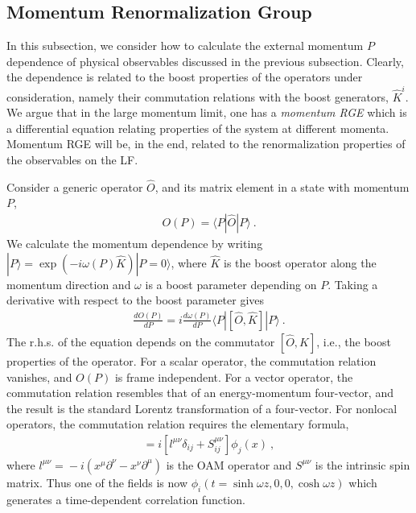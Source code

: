 \subsection{Momentum Renormalization Group}
\label{sec:lamet-rg}
In this subsection, we consider how to calculate the external momentum $P$
dependence of physical observables discussed in
the previous subsection.
Clearly, the dependence is related to the boost properties of
the operators under consideration, namely their commutation relations
with the boost generators, {$\hat{K}^i$}.
We argue that in the large momentum limit, one
has a {\it momentum RGE} which
is a differential equation relating
properties of the system at different momenta.
Momentum RGE will be, in the end, related to
the renormalization properties of the observables on
the LF.

Consider a generic operator $\hat O$, and its
matrix element in a state with momentum $P$,
\begin{align}
	O(P) = \langle P|\hat O|P\rangle \ .
\end{align}
We calculate the momentum dependence by writing $|P\rangle
= \exp(-i\omega(P) \hat K)|P=0\rangle$, where $\hat K$ is
the boost operator along the momentum direction and $\omega$ is
a boost parameter depending on $P$.
Taking a derivative with respect to the {boost} parameter gives
\begin{align}
	\frac{d O(P)}{dP} = i\frac{d\omega(P)}{dP}\langle P|[\hat O,\hat K]|P\rangle \ .
	\label{eq:momden}
\end{align}
The {r.h.s.} of the equation depends on the commutator
$[\hat O,\hat K]$, i.e., the boost properties of the operator.
For a scalar operator, the commutation relation vanishes, and $O(P)$
is frame independent.
For a vector operator, the commutation relation resembles that of an energy-momentum four-vector,
and the result is the standard Lorentz transformation of a four-vector.
For nonlocal operators, the commutation
relation requires the elementary formula,
\begin{align}
	[J^{\mu\nu}, \phi_i(x)] = i\left[l^{\mu\nu}\delta_{ij}+S^{\mu\nu}_{ij}\right]\phi_j(x)\ ,
\end{align}
where $l^{\mu\nu}\!=\!-i (x^{\mu}\partial^{\nu}\!-\!x^{\nu}\partial^{\mu})$ is the OAM operator and $S^{\mu\nu}$ is the intrinsic spin matrix.
Thus one of the fields is now { $\phi_i(t=\sinh\omega z, 0, 0, \cosh\omega z)$}
which generates a time-dependent correlation function.

